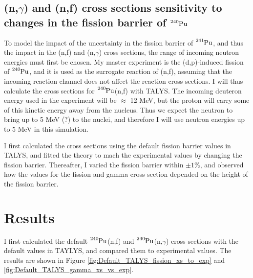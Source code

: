\documentclass[]{article}
\begin{document}
\subsection{(n,$\gamma$) and (n,f) cross sections sensitivity to changes in the fission barrier of $\ce{^{240}Pu}$}


To model the impact of the uncertainty in the fission barrier of $\ce{^{241}Pu}$, and thus the impact in the (n,f) and (n,$\gamma$) cross sections, the range of incoming neutron energies must first be chosen. My master experiment is the (d,p)-induced fission of $\ce{^{240}Pu}$, and it is used as the surrogate reaction of (n,f), assuming that the incoming reaction channel does not affect the reaction cross sections. I will thus calculate the cross sections for $\ce{^{240}Pu}$(n,f) with TALYS. The incoming deuteron energy used in the experiment will be $\approx$ 12 MeV, but the proton will carry some of this kinetic energy away from the nucleus. Thus we expect the neutron to bring up to 5 MeV (?) to the nuclei, and therefore I will use neutron energies up to 5 MeV in this simulation. 
\par 
\vspace{3mm}

I first calculated the cross sections using the default fission barrier values in TALYS, and fitted the theory to mach the experimental values by changing the fission barrier. Thereafter, I varied the fission barrier within $\pm 1 \%$, and observed how the values for the fission and gamma cross section depended on the height of the fission barrier.

\section{Results}

I first calculated the default $\ce{^{240}Pu}$(n,f) and $\ce{^{240}Pu}$(n,$\gamma$) cross sections with the default values in TAYLYS, and compared them to experimental values. The results are shown in Figure \ref{fig:Default_TALYS_fission_xs_to_exp} and \ref{fig:Default_TALYS_gamma_xs_vs_exp}. 
\end{document}
